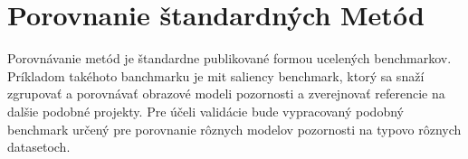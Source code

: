 \section{Porovnanie štandardných Metód}
Porovnávanie metód je štandardne publikované formou ucelených benchmarkov.
Príkladom takéhoto banchmarku je mit saliency benchmark\cite{mit-saliency-benchmark}, ktorý sa snaží zgrupovať a porovnávať obrazové modeli pozornosti a zverejnovať referencie na dalšie podobné projekty.
Pre účeli validácie bude vypracovaný podobný benchmark určený pre porovnanie rôznych modelov pozornosti na typovo rôznych datasetoch.
